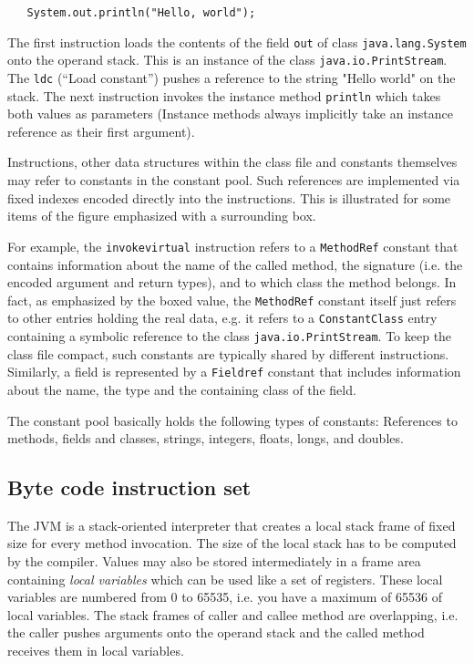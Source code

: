 \documentclass[12pt,twoside]{article}
\newcommand\cp{{constant pool }}
\newcommand\cpe{constant pool}
\begin{document}
\begin{verbatim}
   System.out.println("Hello, world");
\end{verbatim}

The first instruction loads the  contents of the field \texttt{out} of
class  \texttt{java.lang.System} onto  the operand  stack. This  is an
instance of  the class \texttt{java.io.PrintStream}.  The \texttt{ldc}
(``Load constant'') pushes a reference  to the string "Hello world" on
the  stack.    The  next  instruction  invokes   the  instance  method
\texttt{println}  which  takes  both  values as  parameters  (Instance
methods always  implicitly take an  instance reference as  their first
argument).

Instructions,  other  data  structures   within  the  class  file  and
constants  themselves  may  refer  to  constants  in  the  \cpe.  Such
references are implemented via fixed indexes encoded directly into the
instructions.   This  is illustrated  for  some  items  of the  figure
emphasized    with   a    surrounding   box.

For  example,  the  \texttt{invokevirtual}  instruction  refers  to  a
\texttt{MethodRef} constant  that contains information  about the name
of the  called method, the  signature (i.e.  the encoded  argument and
return types),  and to  which class the  method belongs.  In  fact, as
emphasized by the boxed  value, the \texttt{MethodRef} constant itself
just refers to other entries holding the real data, e.g.  it refers to
a \texttt{ConstantClass} entry containing  a symbolic reference to the
class \texttt{java.io.PrintStream}.   To keep the  class file compact,
such  constants  are   typically  shared  by  different  instructions.
Similarly, a field is represented by a \texttt{Fieldref} constant that
includes information about the name, the type and the containing class
of the field.

The \cp  basically holds the following types  of constants: References
to methods, fields and  classes, strings, integers, floats, longs, and
doubles.

\subsection{Byte code instruction set}\label{sec:code}

The JVM  is a  stack-oriented interpreter that  creates a  local stack
frame of fixed size for every method invocation. The size of the local
stack has to  be computed by the compiler.  Values  may also be stored
intermediately in a frame area containing \emph{local variables} which
can  be used  like  a set  of  registers.  These  local variables  are
numbered from 0  to 65535, i.e.  you have a maximum  of 65536 of local
variables.   The  stack  frames   of  caller  and  callee  method  are
overlapping, i.e.  the caller  pushes arguments onto the operand stack
and the called method receives them in local variables.
\end{document}
